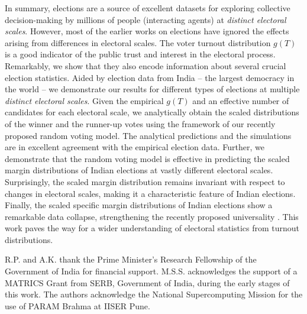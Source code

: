 \documentclass[reprint, pre, twocolumn, aps, showpacs, superscriptaddress]{revtex4-2}
\begin{document}
In summary, elections are a source of excellent datasets for exploring collective decision-making by millions of people (interacting agents) at {\it distinct electoral scales}. However, most of the earlier works on elections have ignored the effects arising from differences in electoral scales. The voter turnout distribution $g(T)$ is a good indicator of the public trust and interest in the electoral process. Remarkably, we show that they also encode information about several crucial election statistics. Aided by election data from India -- the largest democracy in the world -- we demonstrate our results for different types of elections at multiple {\it distinct electoral scales}. Given the empirical $g(T)$ and an effective number of candidates for each electoral scale, we analytically obtain the scaled distributions of the winner and the runner-up votes using the framework of our recently proposed random voting model. The analytical predictions and the simulations are in excellent agreement with the empirical election data. Further, we demonstrate that the random voting model is effective in predicting the scaled margin distributions of Indian elections at vastly different electoral scales. Surprisingly, the scaled margin distribution remains invariant with respect to changes in electoral scales, making it a characteristic feature of Indian elections. Finally, the scaled specific margin distributions of Indian elections show a remarkable data collapse, strengthening the recently proposed universality \cite{pal2024universal}. This work paves the way for a wider understanding of electoral statistics from turnout distributions.

\begin{acknowledgments}
R.P. and A.K. thank the Prime Minister's Research Fellowship of the Government of India for financial support. M.S.S. acknowledges the support of a MATRICS Grant from SERB, Government of India, during the early stages of this work. The authors acknowledge the National Supercomputing Mission for the use of PARAM Brahma at IISER Pune.
\end{acknowledgments}



\newpage
\setcounter{page}{1}
\renewcommand{\thepage}{S\arabic{page}}
\setcounter{equation}{0}
\renewcommand{\theequation}{S\arabic{equation}}
\setcounter{figure}{0}
\renewcommand{\thefigure}{S\arabic{figure}}
\setcounter{section}{0}
\renewcommand{\thesection}{S\arabic{section}}
\setcounter{table}{0}
\renewcommand{\thetable}{S\arabic{table}}
\end{document}
